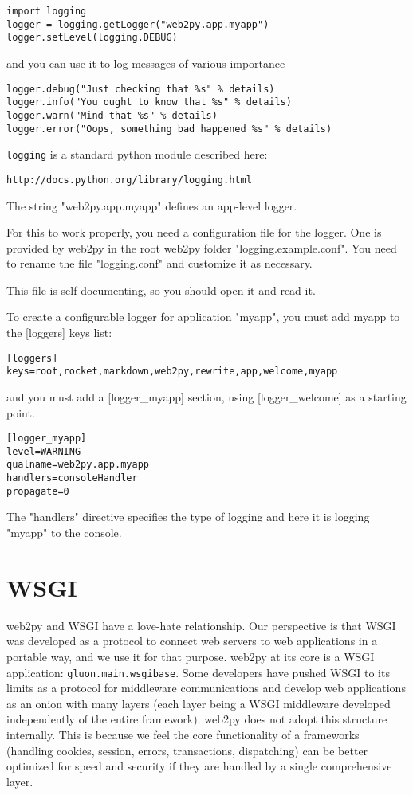 \documentclass[justified,sixbynine,notoc]{tufte-book}
\def\ft{\small\tt}
\def\inxx#1{\index{#1}}
\begin{document}
\begin{fullwidth}
\begin{lstlisting}
import logging
logger = logging.getLogger("web2py.app.myapp")
logger.setLevel(logging.DEBUG)
\end{lstlisting}
\noindent and you can use it to log messages of various importance

\begin{lstlisting}
logger.debug("Just checking that %s" % details)
logger.info("You ought to know that %s" % details)
logger.warn("Mind that %s" % details)
logger.error("Oops, something bad happened %s" % details)
\end{lstlisting}

{\ft logging} is a standard python module described here:
\begin{lstlisting}[keywords={}]
http://docs.python.org/library/logging.html
\end{lstlisting}
The string "web2py.app.myapp" defines an app-level logger.

For this to work properly, you need a configuration file for the logger.
One is provided by web2py in the root web2py folder "logging.example.conf". You need to rename the file "logging.conf" and customize it as necessary.

This file is self documenting, so you should open it and read it.

To create a configurable logger for application "myapp", you must add myapp to
the [loggers] keys list:

\begin{lstlisting}
[loggers]
keys=root,rocket,markdown,web2py,rewrite,app,welcome,myapp
\end{lstlisting}
\noindent and you must add a [logger\_myapp] section, using [logger\_welcome] as a starting point.

\begin{lstlisting}
[logger_myapp]
level=WARNING
qualname=web2py.app.myapp
handlers=consoleHandler
propagate=0
\end{lstlisting}

The "handlers" directive specifies the type of logging and here it is logging "myapp" to the console.

\goodbreak\section{WSGI}

\inxx{WSGI}
\noindent web2py and WSGI have a love-hate relationship. Our perspective is that WSGI was developed as a protocol to connect web servers to web applications in a portable way, and we use it for that purpose. web2py at its core is a WSGI application: {\ft gluon.main.wsgibase}. Some developers have pushed WSGI to its limits as a protocol for middleware communications and develop web applications as an onion with many layers (each layer being a WSGI middleware developed independently of the entire framework). web2py does not adopt this structure internally. This is because we feel the core functionality of a frameworks (handling cookies, session, errors, transactions, dispatching) can be better optimized for speed and security if they are handled by a single comprehensive layer.


\end{fullwidth}
\end{document}
